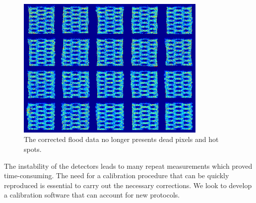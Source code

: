 \begin{figure}[!t]
\centering
\includegraphics[width=3.6in]{figures/plan_data.png}

    \caption{The corrected flood data no longer presents dead pixels and hot spots.} \label{fig:UniCorr}
\end{figure}

The instability of the detectors leads to many repeat measurements which proved time-consuming. The need for a calibration procedure that can be quickly reproduced is essential to carry out the necessary corrections. We look to develop a calibration software that can account for new protocols. 
